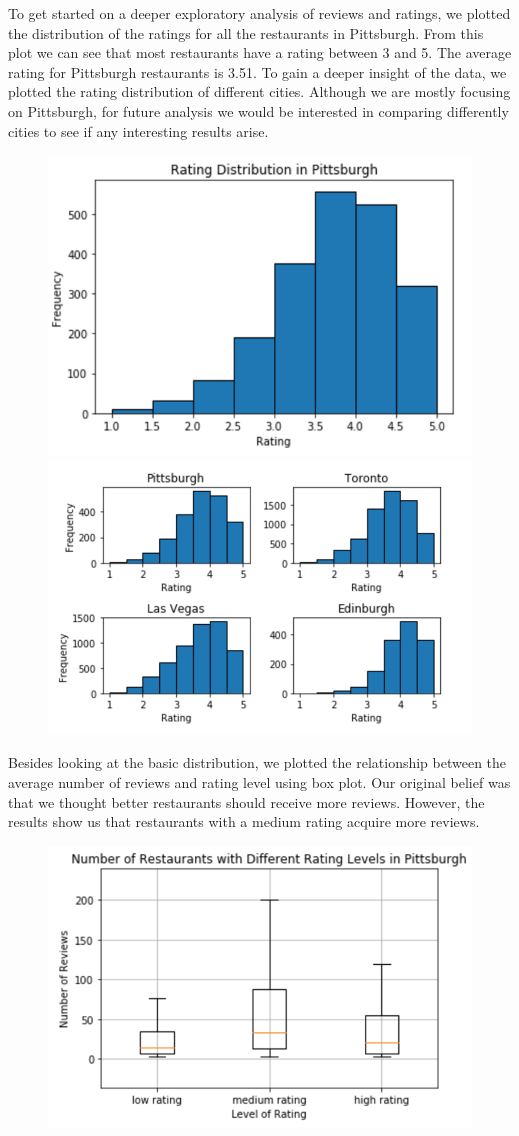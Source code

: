 \documentclass{neu_handout}
\begin{document}
To get started on a deeper exploratory analysis of reviews and ratings, we plotted the distribution of the ratings for all the restaurants in Pittsburgh. From this plot we can see that most restaurants have a rating between 3 and 5. The average rating for Pittsburgh restaurants is 3.51. To gain a deeper insight of the data, we plotted the rating distribution of different cities. Although we are mostly focusing on Pittsburgh, for future analysis we would be interested in comparing differently cities to see if any interesting results arise.

\begin{figure}[h]
\centering
{
\includegraphics[width=0.4\linewidth]{rating_distribution_in_Pittsburgh}
}
{
\includegraphics[width=0.4\linewidth]{rating_distribution_vs_countries}
}
\end{figure}

Besides looking at the basic distribution, we plotted the relationship between the average number of reviews and rating level using box plot. Our original belief was that we thought better restaurants should receive more reviews. However, the results show us that restaurants with a medium rating acquire more reviews. 

\begin{figure}[h]
\centering
{
\includegraphics[width=0.4\linewidth]{number_of_restaurants_vs_rating_level}
}
\end{figure}
\end{document}
